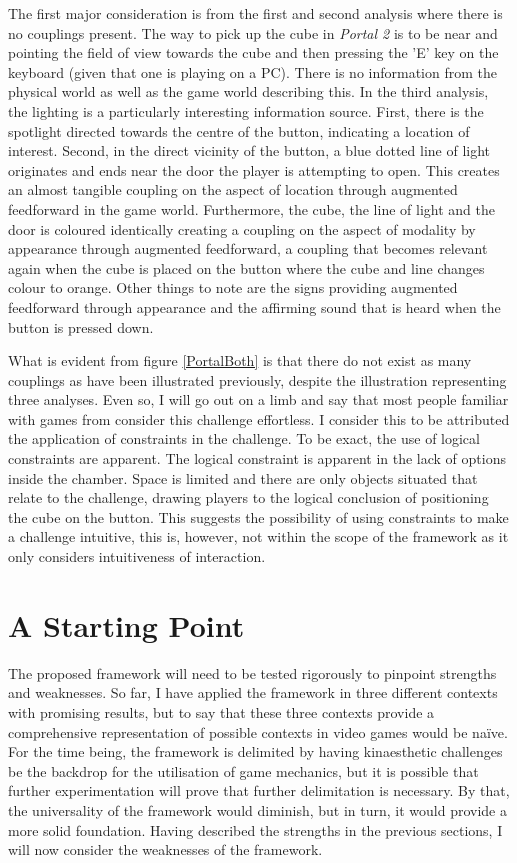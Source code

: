 The first major consideration is from the first and second analysis where there is no couplings present. The way to pick up the cube in \textit{Portal 2} is to be near and pointing the field of view towards the cube and then pressing the 'E' key on the keyboard (given that one is playing on a PC). There is no information from the physical world as well as the game world describing this. In the third analysis, the lighting is a particularly interesting information source. First, there is the spotlight directed towards the centre of the button, indicating a location of interest. Second, in the direct vicinity of the button, a blue dotted line of light originates and ends near the door the player is attempting to open. This creates an almost tangible coupling on the aspect of location through augmented feedforward in the game world. Furthermore, the cube, the line of light and the door is coloured identically creating a coupling on the aspect of modality by appearance through augmented feedforward, a coupling that becomes relevant again when the cube is placed on the button where the cube and line changes colour to orange. Other things to note are the signs providing augmented feedforward through appearance and the affirming sound that is heard when the button is pressed down.

What is evident from figure \ref{PortalBoth} is that there do not exist as many couplings as have been illustrated previously, despite the illustration representing three analyses. Even so, I will go out on a limb and say that most people familiar with games from  consider this challenge effortless. I consider this to be attributed the application of constraints in the challenge. To be exact, the use of logical constraints are apparent. The logical constraint is apparent in the lack of options inside the chamber. Space is limited and there are only objects situated that relate to the challenge, drawing players to the logical conclusion of positioning the cube on the button. This suggests the possibility of using constraints to make a challenge intuitive, this is, however, not within the scope of the framework as it only considers intuitiveness of interaction.

\section{A Starting Point}
The proposed framework will need to be tested rigorously to pinpoint strengths and weaknesses. So far, I have applied the framework in three different contexts with promising results, but to say that these three contexts provide a comprehensive representation of possible contexts in video games would be naïve. For the time being, the framework is delimited by having kinaesthetic challenges be the backdrop for the utilisation of game mechanics, but it is possible that further experimentation will prove that further delimitation is necessary. By that, the universality of the framework would diminish, but in turn, it would provide a more solid foundation. Having described the strengths in the previous sections, I will now consider the weaknesses of the framework.

